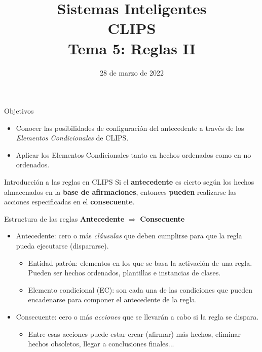 \documentclass[usenames,dvipsnames,aspectratio=169]{beamer}
\title[]{{\LARGE Sistemas Inteligentes\\CLIPS}\\[0.5cm]Tema 5: Reglas II}
\date[Marzo, 2022]{28 de marzo de 2022}
\author[A. Esteban]{\texorpdfstring{
    \begin{minipage}{0.47\linewidth}
        Aurora Esteban Toscano
        \pdfnewline
        \texttt{aestebant@uco.es}
    \end{minipage}
}{Aurora Esteban Toscano}
}
\institute{Grado en Ingeniería Informática, Universidad de Córdoba}
\begin{document}

\begin{frame}
\titlepage
\end{frame}

\begin{frame}{Objetivos}
	\begin{itemize}
		\item Conocer las posibilidades de configuración del antecedente a través de los \textit{Elementos Condicionales} de CLIPS.
		\item Aplicar los Elementos Condicionales tanto en hechos ordenados como en no ordenados.
	\end{itemize}
\end{frame}

\begin{frame}{Introducción a las reglas en CLIPS}
	Si el \textbf{antecedente} es cierto según los hechos almacenados en la \textbf{base de afirmaciones}, entonces \textbf{pueden} realizarse las acciones especificadas en el \textbf{consecuente}.
	\begin{block}{Estructura de las reglas}
		\centering
		\textbf{Antecedente} $\Longrightarrow$ \textbf{Consecuente}
	\end{block}
	\begin{itemize}
		\item Antecedente: cero o más \textit{cláusulas} que deben cumplirse para que la regla pueda ejecutarse (dispararse).
		\begin{itemize}
			\item Entidad patrón: elementos en los que se basa la activación de una regla. Pueden ser hechos ordenados, plantillas e instancias de clases.
			\item Elemento condicional (EC): son cada una de las condiciones que pueden encadenarse para componer el antecedente de la regla. 
		\end{itemize}
		\item Consecuente: cero o más \textit{acciones} que se llevarán a cabo si la regla se dispara.
		\begin{itemize}
			\item Entre esas acciones puede estar crear (afirmar) más hechos, eliminar hechos obsoletos, llegar a conclusiones finales...
		\end{itemize}
	\end{itemize}
\end{frame}
\end{document}
